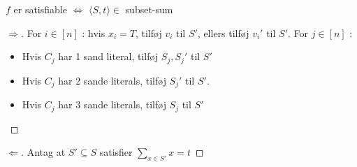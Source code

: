 \begin{claim}
$f$ er satisfiable $\iff$ $\langle S,t\rangle \in $  subset-sum
\end{claim}

\begin{proof}[\(\Rightarrow\)]
  For $i \in [n]$ : hvis $x_{i} = T$, tilføj $v_{i}$ til $S'$, ellers tilføj $v_{i}'$ til $S'$. For $j \in [n]$ :
  \begin{itemize}
    \item Hvis $C_{j}$ har 1 sand literal, tilføj $S_{j}, S_{j}'$ til $S'$
    \item Hvis $C_{j}$ har 2 sande literals, tilføj $S_{j}'$ til $S'$.
    \item Hvis $C_{j}$ har 3 sande literals, tilføj $S_{j}$ til $S'$
  \end{itemize}
\end{proof}

\begin{proof}[\(\Leftarrow\)]
Antag at $S' \subseteq S$ satisfier $\sum_{x \in S'}x = t$
\end{proof}




